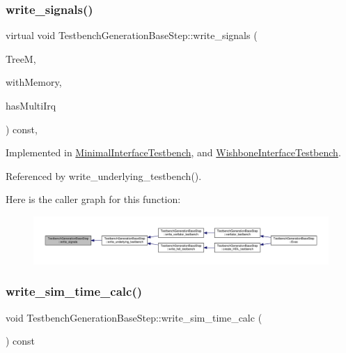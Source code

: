 \subsubsection{\texorpdfstring{write\+\_\+signals()}{write\_signals()}}
{\footnotesize\ttfamily virtual void Testbench\+Generation\+Base\+Step\+::write\+\_\+signals (\begin{DoxyParamCaption}\item[{const \hyperlink{tree__manager_8hpp_a792e3f1f892d7d997a8d8a4a12e39346}{tree\+\_\+manager\+Const\+Ref}}]{TreeM,  }\item[{bool \&}]{with\+Memory,  }\item[{bool \&}]{has\+Multi\+Irq }\end{DoxyParamCaption}) const\hspace{0.3cm}{\ttfamily [protected]}, {}}



Implemented in \hyperlink{classMinimalInterfaceTestbench_ae769d22c64fd7d99cbfb435881cc0fc0}{Minimal\+Interface\+Testbench}, and \hyperlink{classWishboneInterfaceTestbench_af319e1ea1cb928d2d4ce67815622b62e}{Wishbone\+Interface\+Testbench}.



Referenced by write\+\_\+underlying\+\_\+testbench().

Here is the caller graph for this function\+:
\nopagebreak
\begin{figure}[H]
\begin{center}
\leavevmode
\includegraphics[width=350pt]{dc/d02/classTestbenchGenerationBaseStep_af4bf6836e809359aa23a892ea16c08df_icgraph}
\end{center}
\end{figure}
\mbox{\label{classTestbenchGenerationBaseStep_a26f47a71a80495e7ee72fd5d56a0d647}} 
\subsubsection{\texorpdfstring{write\+\_\+sim\+\_\+time\+\_\+calc()}{write\_sim\_time\_calc()}}
{\footnotesize\ttfamily void Testbench\+Generation\+Base\+Step\+::write\+\_\+sim\+\_\+time\+\_\+calc (\begin{DoxyParamCaption}{ }\end{DoxyParamCaption}) const\hspace{0.3cm}{\ttfamily [protected]}}



